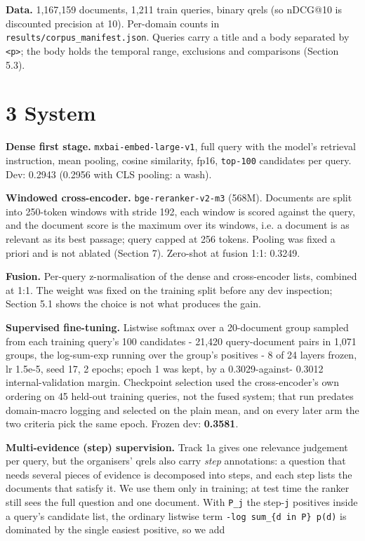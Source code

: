 \documentclass[11pt]{article}
\begin{document}
\textbf{Data.} 1,167,159 documents, 1,211 train queries, binary qrels (so nDCG@10 is discounted precision at 10). Per-domain counts in \texttt{results/corpus\_manifest.json}. Queries carry a title and a body separated by \texttt{<p>}; the body holds the temporal range, exclusions and comparisons (Section 5.3).

\section*{3 System}
\textbf{Dense first stage.} \texttt{mxbai-embed-large-v1}, full query with the model’s retrieval instruction, mean pooling, cosine similarity, fp16, \texttt{top-100} candidates per query. Dev: 0.2943 (0.2956 with CLS pooling: a wash).

\textbf{Windowed cross-encoder.} \texttt{bge-reranker-v2-m3} (568M). Documents are split into 250-token windows with stride 192, each window is scored against the query, and the document score is the maximum over its windows, i.e. a document is as relevant as its best passage; query capped at 256 tokens. Pooling was fixed a priori and is not ablated (Section 7). Zero-shot at fusion 1:1: 0.3249.

\textbf{Fusion.} Per-query z-normalisation of the dense and cross-encoder lists, combined at 1:1. The weight was fixed on the training split before any dev inspection; Section 5.1 shows the choice is not what produces the gain.

\textbf{Supervised fine-tuning.} Listwise softmax over a 20-document group sampled from each training query’s 100 candidates - 21,420 query-document pairs in 1,071 groups, the log-sum-exp running over the group’s positives - 8 of 24 layers frozen, lr 1.5e-5, seed 17, 2 epochs; epoch 1 was kept, by a 0.3029-against- 0.3012 internal-validation margin. Checkpoint selection used the cross-encoder’s own ordering on 45 held-out training queries, not the fused system; that run predates domain-macro logging and selected on the plain mean, and on every later arm the two criteria pick the same epoch. Frozen dev: \textbf{0.3581}.

\textbf{Multi-evidence (step) supervision.} Track 1a gives one relevance judgement per query, but the organisers’ qrels also carry \emph{step} annotations: a question that needs several pieces of evidence is decomposed into steps, and each step lists the documents that satisfy it. We use them only in training; at test time the ranker still sees the full question and one document. With \texttt{P\_j} the step-\texttt{j} positives inside a query’s candidate list, the ordinary listwise term \texttt{-log sum\_\{d in P\} p(d)} is dominated by the single easiest positive, so we add
\end{document}
